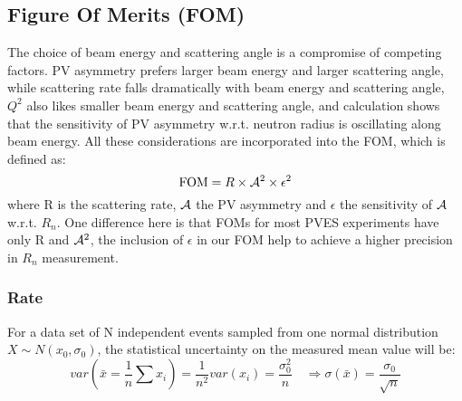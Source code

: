 \subsection{Figure Of Merits (FOM)}
The choice of beam energy and scattering angle is a compromise of competing
factors. PV asymmetry prefers larger beam energy and larger scattering angle,
while scattering rate falls dramatically with beam energy and scattering angle,
$Q^2$ also likes smaller beam energy and scattering angle, and calculation 
shows that the sensitivity of PV asymmetry w.r.t. neutron radius is oscillating
along beam energy. All these considerations are incorporated into the FOM, which
is defined as:
\begin{equation*}
    \text{FOM} = R \times \mathcal{A}^2 \times \epsilon^2
\end{equation*}
where R is the scattering rate, $\mathcal{A}$ the PV asymmetry and $\epsilon$ 
the sensitivity of $\mathcal{A}$ w.r.t. $R_n$. One difference here is that FOMs for most PVES 
experiments have only R and $\mathcal{A}^2$, the inclusion of $\epsilon$ in our FOM help
to achieve a higher precision in $R_n$ measurement.

\subsubsection{Rate}
For a data set of N independent events sampled from one normal distribution 
$X\sim N(x_0, \sigma_0)$, the statistical uncertainty on the measured mean value
will be:
$$ var(\bar{x} = \frac{1}{n}\sum x_i) = \frac{1}{n^2}var(x_i) = \frac{\sigma_0^2}{n} 
\quad \Longrightarrow \sigma(\bar{x}) = \frac{\sigma_0}{\sqrt{n}} $$

